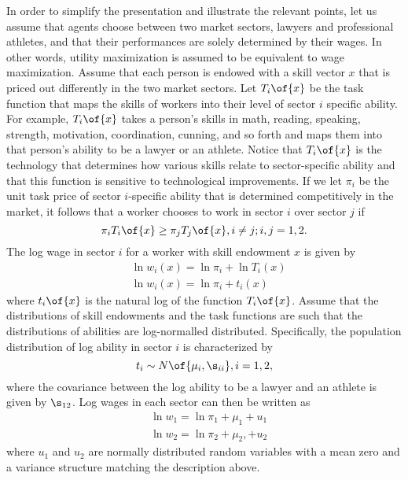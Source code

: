 \documentclass[12pt]{article}
\newcommand{\CiteReference}{../reference.bib}
\theoremstyle{definition}
\begin{document}
In order to simplify the presentation and illustrate the relevant points, let us assume that agents choose between two market sectors, lawyers and professional athletes, and that their performances are solely determined by their wages. In other words, utility maximization is assumed to be equivalent to wage maximization. Assume that each person is endowed with a skill vector $x$ that is priced out differently in the two market sectors. Let $T_i\of{x}$ be the task function that maps the skills of workers into their level of sector $i$ specific ability. For example, $T_i\of{x}$ takes a person's skills in math, reading, speaking, strength, motivation, coordination, cunning, and so forth and maps them into that person's ability to be a lawyer or an athlete. Notice that $T_i\of{x}$ is the technology that determines how various skills relate to sector-specific ability and that this function is sensitive to technological improvements. If we let $\pi_i$ be the unit task price of sector $i$-specific ability that is determined competitively in the market, it follows that a worker chooses to work in sector $i$ over sector $j$ if 
\begin{equation}
    \label{1}
    \pi_i T_i\of{x} \geq \pi_j T_j\of{x}, i \neq j; i, j = 1, 2.
\end{equation}
The log wage in sector $i$ for a worker with skill endowment $x$ is given by 
\begin{equation}
    \label{2} 
    \begin{aligned}
        & \ln w_i(x)=\ln \pi_i+\ln T_i(x) \\
        & \ln w_i(x)=\ln \pi_i+t_i(x)
    \end{aligned}
\end{equation}
where $t_i\of{x}$ is the natural log of the function $T_i\of{x}$. Assume that the distributions of skill endowments and the task functions are such that the distributions of abilities are log-normalled distributed. Specifically, the population distribution of log ability in sector $i$ is characterized by 
\begin{equation}
    \notag 
    t_i \sim N\of{\mu_i, \s_{ii}}, i = 1, 2,
\end{equation}
where the covariance between the log ability to be a lawyer and an athlete is given by $\s_{12}$. Log wages in each sector can then be written as 
\begin{equation}
    \label{3}
    \begin{aligned}
        & \ln w_1=\ln \pi_1+\mu_1+u_1 \\
        & \ln w_2=\ln \pi_2+\mu_2,+u_2
    \end{aligned}
\end{equation}
where $u_1$ and $u_2$ are normally distributed random variables with a mean zero and a variance structure matching the description above.


 
\end{document}
